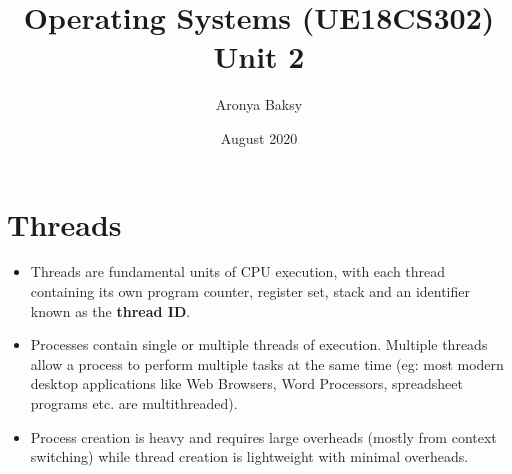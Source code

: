 \documentclass{article}
\title{Operating Systems (UE18CS302)\\
    \large Unit 2}
\author{Aronya Baksy}
\date{August 2020}
\theoremstyle{plain}
\theoremstyle{definition}
\begin{document}
    \maketitle
    
\section{Threads}
\begin{itemize}
    \item Threads are fundamental units of CPU execution, with each thread containing its own program counter, register set, stack and an identifier known as the \textbf{thread ID}.
    
    \item Processes contain single or multiple threads of execution. Multiple threads allow a process to perform multiple tasks at the same time (eg: most modern desktop applications like Web Browsers, Word Processors, spreadsheet programs etc. are multithreaded).
    
    \item Process creation is heavy and requires large overheads (mostly from context switching) while thread creation is lightweight with minimal overheads.
\end{itemize}
\end{document}
